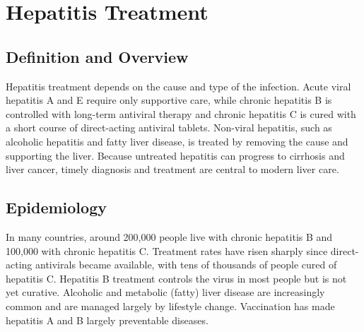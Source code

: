 \chapter{Hepatitis Treatment}

\section*{Definition and Overview}
Hepatitis treatment depends on the cause and type of the infection. Acute viral hepatitis A and E require only supportive care, while chronic hepatitis B is controlled with long-term antiviral therapy and chronic hepatitis C is cured with a short course of direct-acting antiviral tablets. Non-viral hepatitis, such as alcoholic hepatitis and fatty liver disease, is treated by removing the cause and supporting the liver. Because untreated hepatitis can progress to cirrhosis and liver cancer, timely diagnosis and treatment are central to modern liver care.

\section*{Epidemiology}
In many countries, around 200,000 people live with chronic hepatitis B and 100,000 with chronic hepatitis C. Treatment rates have risen sharply since direct-acting antivirals became available, with tens of thousands of people cured of hepatitis C. Hepatitis B treatment controls the virus in most people but is not yet curative. Alcoholic and metabolic (fatty) liver disease are increasingly common and are managed largely by lifestyle change. Vaccination has made hepatitis A and B largely preventable diseases.

